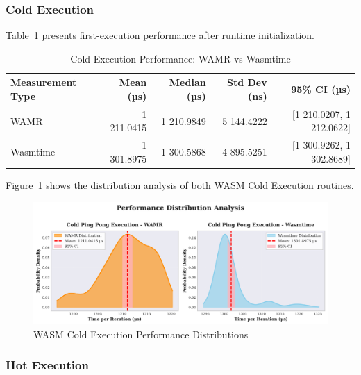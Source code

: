 \subsubsection{Cold Execution}
\label{subsubsec:wasm-cold-execution-performance}

Table~\ref{tab:wasm-cold-execution-performance} presents first-execution performance after runtime initialization.

\begin{table}[h]
    \centering
    \caption{Cold Execution Performance: WAMR vs Wasmtime}
    \label{tab:wasm-cold-execution-performance}
    \begin{tabular}{lrrrr}
        \toprule
        \textbf{Measurement Type} & \textbf{Mean (µs)} & \textbf{Median (µs)} & \textbf{Std Dev (ns)} & \textbf{95\% CI (µs)} \\
        \midrule
        WAMR          & 1 211.0415 & 1 210.9849 & 5 144.4222 & [1 210.0207, 1 212.0622] \\
        Wasmtime      & 1 301.8975 & 1 300.5868 & 4 895.5251 & [1 300.9262, 1 302.8689] \\
        \bottomrule
    \end{tabular}
\end{table}

Figure~\ref{fig:wasm-cold-execution-distributions} shows the distribution analysis of both \acrshort{WASM} Cold Execution routines.

\begin{figure}[h]
    \centering
    \includegraphics[width=\textwidth]{images/wasm-cold-distributions}
    \caption{\acrshort{WASM} Cold Execution Performance Distributions}
    \label{fig:wasm-cold-execution-distributions}
\end{figure}

\subsubsection{Hot Execution}
\label{subsubsec:wasm-hot-execution}

